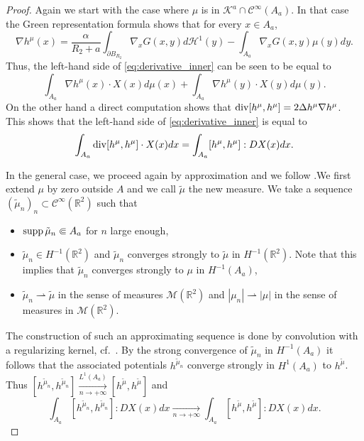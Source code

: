 \documentclass[12pt,reqno]{amsart}
\def\C{{\mathcal C}}
\def\supp{{\rm supp\,}}
\def \p {\partial}
\newcommand{\R}{\mathbb{R}}
\DeclareMathOperator \dive{\rm {div}}
\numberwithin{equation}{section}
\begin{document}
\begin{proof}
Again we start with the case where \(\mu\) is in \(\mathcal{K}^a\cap\C^\infty(A_a)\). In that case the Green representation formula shows that for every \(x\in A_a\),
\begin{equation*}
\nabla h^\mu(x)=  \frac{\alpha}{R_2+a}\int_{\p B_{R_2}} \nabla_xG(x,y) d\mathcal{H}^1(y)-\int_{A_a} \nabla_xG(x,y) \mu(y) d y.
\end{equation*}
Thus, the left-hand side of \eqref{eq:derivative_inner} can be seen to be equal to
\begin{equation*}
\int_{A_a} \nabla h^\mu(x)\cdot X(x) d\mu(x) +\int_{A_a}\nabla h^\mu(y)\cdot X(y) d\mu(y).
\end{equation*}
On the other hand a direct computation shows that \(\dive [h^\mu,h^\mu]=2\Delta h^\mu \nabla h^\mu\). This shows that the left-hand side of \eqref{eq:derivative_inner} is equal to
\begin{equation*}
\int_{A_a} \dive [h^\mu,h^\mu]\cdot X(x) dx=\int_{A_a} [h^\mu,h^\mu]:DX(x) dx.
\end{equation*}

In the general case, we proceed again by approximation and we follow \cite[Proposition 6.4]{Peszek_Rodiac_2025}.We first extend \(\mu\) by zero outside \(A\) and we call \(\tilde{\mu}\) the new measure. We take a sequence \((\tilde{\mu}_n)_n \subset \C^\infty (\R^2)\) such that
\begin{itemize}
\item  \(\supp \tilde{\mu}_n \Subset A_a\) for \(n \) large enough,
\item \(\tilde{\mu}_n\in H^{-1}(\R^2)\) and \(\tilde{\mu}_n\) converges strongly to \(\tilde{\mu}\) in \(H^{-1}(\R^2)\). Note that this implies that \(\tilde{\mu}_n\) converges strongly to \(\mu\) in \(H^{-1}(A_a)\),
\item \(\tilde{\mu}_n \rightharpoonup \tilde{\mu}\) in the sense of measures \(\mathcal{M}(\R^2)\) and \(|\mu_n| \rightharpoonup |\mu|\) in the sense of measures in \(\mathcal{M}(\R^2)\).
\end{itemize}
The construction of such an approximating sequence is done by convolution with a regularizing kernel, cf.\ \cite[Theorem 2.2]{Ambrosio_Fusco_Pallara_2000}. By the strong convergence of \(\tilde{\mu}_n\) in \(H^{-1}(A_a)\) it follows that the associated potentials \(h^{\tilde{\mu}_n}\) converge strongly in \(H^1(A_a)\) to \(h^{\tilde{\mu}}\). Thus \([h^{\tilde{\mu}_n},h^{\tilde{\mu}_n}]\xrightarrow [n\to +\infty]{L^1(A_a)} [h^{\tilde{\mu}},h^{\tilde{\mu}}]\) and
\begin{equation*}
\int_{A_a} [h^{\tilde{\mu}_n},h^{\tilde{\mu}_n}]:DX(x) dx \xrightarrow[n \to +\infty]{}  \int_{A_a} [h^{\tilde{\mu}},h^{\tilde{\mu}}]:DX(x) dx.
\end{equation*}



\end{proof}
\end{document}
